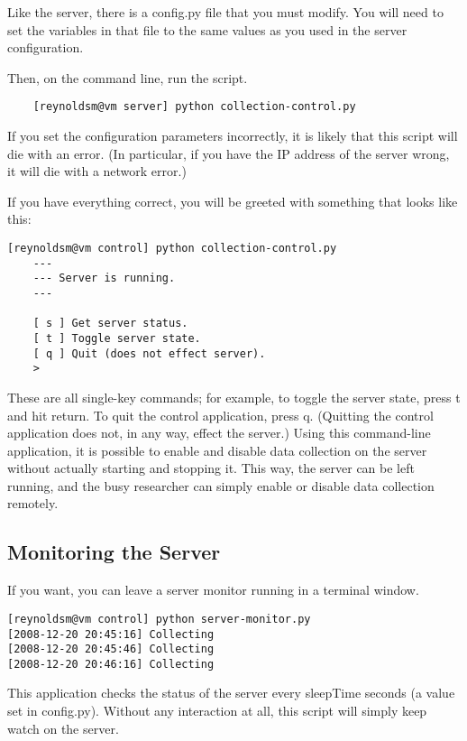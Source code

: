 \documentclass[12pt]{article}
\begin{document}
Like the server, there is a {\code config.py} file that you must modify. You will need to set the variables in that file to the same values as you used in the server configuration.

Then, on the command line, run the script.

\begin{verbatim}
	[reynoldsm@vm server] python collection-control.py
\end{verbatim}


If you set the configuration parameters incorrectly, it is likely that this script will die with an error. (In particular, if you have the IP address of the server wrong, it will die with a network error.) 

If you have everything correct, you will be greeted with something that looks like this:

\begin{verbatim}
[reynoldsm@vm control] python collection-control.py 
	---
	--- Server is running.
	---

	[ s ] Get server status.
	[ t ] Toggle server state.
	[ q ] Quit (does not effect server).
	> 
\end{verbatim}

These are all single-key commands; for example, to toggle the server state, press {\code t} and hit return. To quit the control application, press {\code q}. (Quitting the control application does not, in any way, effect the server.) Using this command-line application, it is possible to enable and disable data collection on the server without actually starting and stopping it. This way, the server can be left running, and the busy researcher can simply enable or disable data collection remotely.

\subsection{Monitoring the Server}

If you want, you can leave a server monitor running in a terminal window.

\begin{verbatim}
[reynoldsm@vm control] python server-monitor.py 
[2008-12-20 20:45:16] Collecting
[2008-12-20 20:45:46] Collecting
[2008-12-20 20:46:16] Collecting
\end{verbatim}

This application checks the status of the server every {\code sleepTime} seconds (a value set in {\code config.py}). Without any interaction at all, this script will simply keep watch on the server. 
\end{document}
